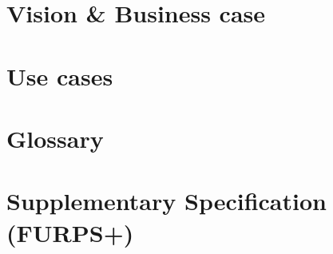 \documentclass[11pt,a4paper]{article}
\begin{document}
\tableofcontents
\newpage

\section{Vision \& Business case}

\section{Use cases}

\section{Glossary}

\section{Supplementary Specification (FURPS+)}
	
\end{document}
